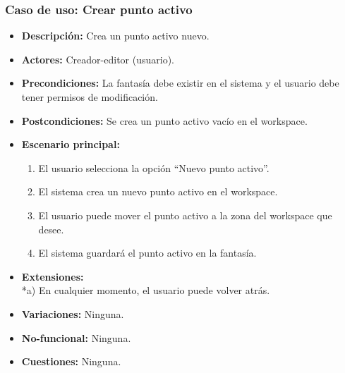 \subsubsection{Caso de uso: Crear punto activo}
\begin{itemize}
	\item \textbf{Descripción:} Crea un punto activo nuevo.
	\item \textbf{Actores:} Creador-editor (usuario).
	\item \textbf{Precondiciones:} La fantasía debe existir en el sistema y el usuario debe tener permisos de modificación.
	\item \textbf{Postcondiciones:} Se crea un punto activo vacío en el workspace.
	\item \textbf{Escenario principal:}
	\begin{enumerate}
		\item El usuario selecciona la opción ``Nuevo punto activo''.
		\item El sistema crea un nuevo punto activo en el workspace.
		\item El usuario puede mover el punto activo a la zona del workspace que desee.
		\item El sistema guardará el punto activo en la fantasía.
	\end{enumerate}
	\item \textbf{Extensiones:} \\ *a) En cualquier momento, el usuario puede volver atrás.
	\item \textbf{Variaciones:} Ninguna.
	\item \textbf{No-funcional:} Ninguna.
	\item \textbf{Cuestiones:} Ninguna.
\end{itemize}


